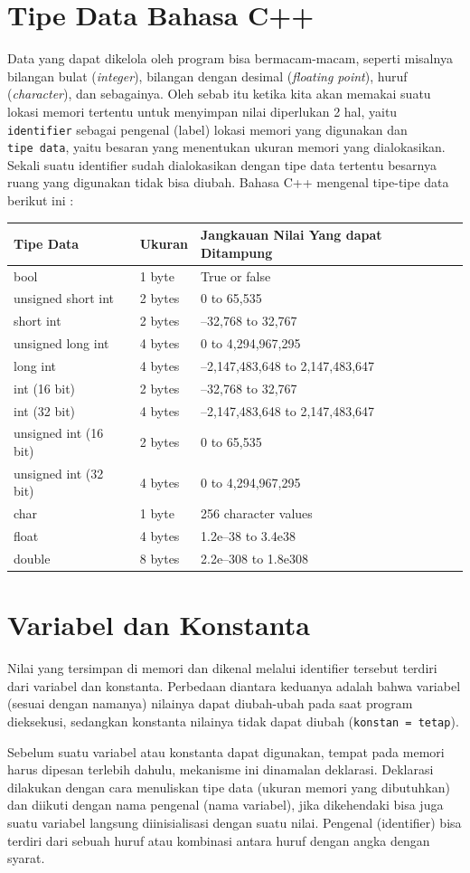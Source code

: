 \section{Tipe Data Bahasa C++}\label{tipe-data-bahasa-c}

Data yang dapat dikelola oleh program bisa bermacam-macam, seperti
misalnya bilangan bulat (\emph{integer}), bilangan dengan desimal
(\emph{floating point}), huruf (\emph{character}), dan sebagainya. Oleh
sebab itu ketika kita akan memakai suatu lokasi memori tertentu untuk
menyimpan nilai diperlukan 2 hal, yaitu \texttt{identifier} sebagai
pengenal (label) lokasi memori yang digunakan dan \texttt{tipe\ data},
yaitu besaran yang menentukan ukuran memori yang dialokasikan. Sekali
suatu identifier sudah dialokasikan dengan tipe data tertentu besarnya
ruang yang digunakan tidak bisa diubah. Bahasa C++ mengenal tipe-tipe
data berikut ini :

\begin{longtable}[]{@{}lll@{}}
\toprule
Tipe Data & Ukuran & Jangkauan Nilai Yang dapat Ditampung\tabularnewline
\midrule
\endhead
bool & 1 byte & True or false\tabularnewline
unsigned short int & 2 bytes & 0 to 65,535\tabularnewline
short int & 2 bytes & --32,768 to 32,767\tabularnewline
unsigned long int & 4 bytes & 0 to 4,294,967,295\tabularnewline
long int & 4 bytes & --2,147,483,648 to 2,147,483,647\tabularnewline
int (16 bit) & 2 bytes & --32,768 to 32,767\tabularnewline
int (32 bit) & 4 bytes & --2,147,483,648 to 2,147,483,647\tabularnewline
unsigned int (16 bit) & 2 bytes & 0 to 65,535\tabularnewline
unsigned int (32 bit) & 4 bytes & 0 to 4,294,967,295\tabularnewline
char & 1 byte & 256 character values\tabularnewline
float & 4 bytes & 1.2e--38 to 3.4e38\tabularnewline
double & 8 bytes & 2.2e--308 to 1.8e308\tabularnewline
\bottomrule

\end{longtable}

\section{Variabel dan Konstanta}\label{variabel-dan-konstanta}

Nilai yang tersimpan di memori dan dikenal melalui identifier tersebut
terdiri dari variabel dan konstanta. Perbedaan diantara keduanya adalah
bahwa variabel (sesuai dengan namanya) nilainya dapat diubah-ubah pada
saat program dieksekusi, sedangkan konstanta nilainya tidak dapat diubah
(\texttt{konstan\ =\ tetap}).

Sebelum suatu variabel atau konstanta dapat digunakan, tempat pada
memori harus dipesan terlebih dahulu, mekanisme ini dinamalan deklarasi.
Deklarasi dilakukan dengan cara menuliskan tipe data (ukuran memori yang
dibutuhkan) dan diikuti dengan nama pengenal (nama variabel), jika
dikehendaki bisa juga suatu variabel langsung diinisialisasi dengan
suatu nilai. Pengenal (identifier) bisa terdiri dari sebuah huruf atau
kombinasi antara huruf dengan angka dengan syarat.

